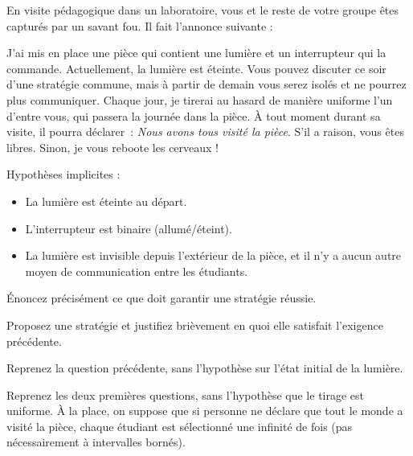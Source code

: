 
\begingroup

\begin{exercice}
  \label{exo:introduction/mad_scientist}

  En visite pédagogique dans un laboratoire, vous et le reste de votre groupe êtes 
  capturés par un savant fou. Il fait l'annonce suivante :

  \og
  J'ai mis en place une pièce qui contient une lumière et un interrupteur
  qui la commande. Actuellement, la lumière est éteinte.
  Vous pouvez discuter ce soir d'une stratégie commune, mais à partir de demain
  vous serez isolés et ne pourrez plus communiquer.
  Chaque jour, je tirerai au hasard de manière uniforme l'un d'entre vous, qui passera la journée dans la pièce.
  À tout moment durant sa visite, il pourra déclarer~: \emph{Nous avons tous visité la pièce}.
  S'il a raison, vous êtes libres. Sinon, je vous reboote les cerveaux !
  \fg

  Hypothèses implicites :
  \begin{itemize}
    \item La lumière est éteinte au départ.
    \item L'interrupteur est binaire (allumé/éteint).
    \item La lumière est invisible depuis l'extérieur de la pièce,
      et il n'y a aucun autre moyen de communication entre les étudiants.
  \end{itemize}
  
  \begin{question}
    \item Énoncez précisément ce que doit garantir une stratégie réussie.
    \item Proposez une stratégie et justifiez brièvement en quoi elle satisfait l'exigence précédente.
    \item Reprenez la question précédente, sans l'hypothèse sur l'état initial de la lumière.
    \item Reprenez les deux premières questions, sans l'hypothèse que le tirage est uniforme. À la place, on suppose
      que si personne ne déclare que tout le monde a visité la pièce, chaque étudiant est sélectionné une infinité de fois
      (pas nécessairement à intervalles bornés). 
  \end{question}

\end{exercice}

\endgroup
\endinput
